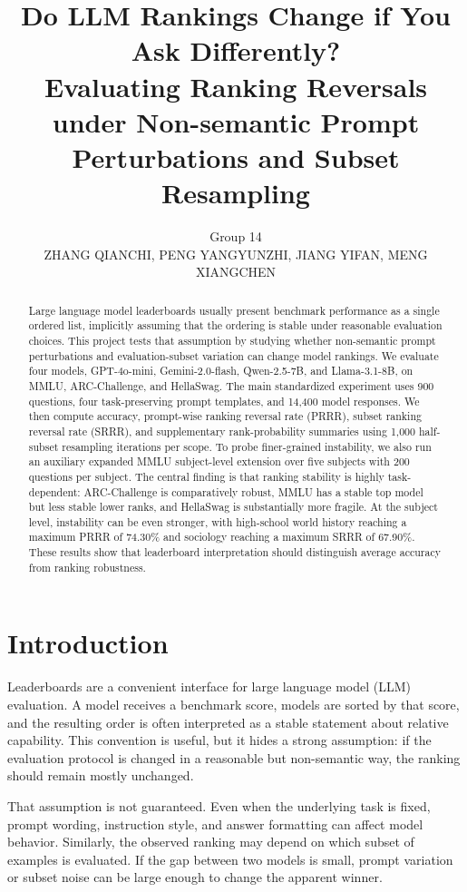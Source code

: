 \documentclass[11pt]{article}
\title{\textbf{Do LLM Rankings Change if You Ask Differently?}\\
\large Evaluating Ranking Reversals under Non-semantic Prompt Perturbations and Subset Resampling}
\author{Group 14\\
ZHANG QIANCHI, PENG YANGYUNZHI, JIANG YIFAN, MENG XIANGCHEN}
\date{}
\begin{document}
\maketitle
\vspace{-1em}

\begin{abstract}
Large language model leaderboards usually present benchmark performance as a single ordered list, implicitly assuming that the ordering is stable under reasonable evaluation choices. This project tests that assumption by studying whether non-semantic prompt perturbations and evaluation-subset variation can change model rankings. We evaluate four models, GPT-4o-mini, Gemini-2.0-flash, Qwen-2.5-7B, and Llama-3.1-8B, on MMLU, ARC-Challenge, and HellaSwag. The main standardized experiment uses 900 questions, four task-preserving prompt templates, and 14,400 model responses. We then compute accuracy, prompt-wise ranking reversal rate (PRRR), subset ranking reversal rate (SRRR), and supplementary rank-probability summaries using 1,000 half-subset resampling iterations per scope. To probe finer-grained instability, we also run an auxiliary expanded MMLU subject-level extension over five subjects with 200 questions per subject. The central finding is that ranking stability is highly task-dependent: ARC-Challenge is comparatively robust, MMLU has a stable top model but less stable lower ranks, and HellaSwag is substantially more fragile. At the subject level, instability can be even stronger, with high-school world history reaching a maximum PRRR of 74.30\% and sociology reaching a maximum SRRR of 67.90\%. These results show that leaderboard interpretation should distinguish average accuracy from ranking robustness.
\end{abstract}

\section{Introduction}

Leaderboards are a convenient interface for large language model (LLM) evaluation. A model receives a benchmark score, models are sorted by that score, and the resulting order is often interpreted as a stable statement about relative capability. This convention is useful, but it hides a strong assumption: if the evaluation protocol is changed in a reasonable but non-semantic way, the ranking should remain mostly unchanged.

That assumption is not guaranteed. Even when the underlying task is fixed, prompt wording, instruction style, and answer formatting can affect model behavior. Similarly, the observed ranking may depend on which subset of examples is evaluated. If the gap between two models is small, prompt variation or subset noise can be large enough to change the apparent winner.
\end{document}
